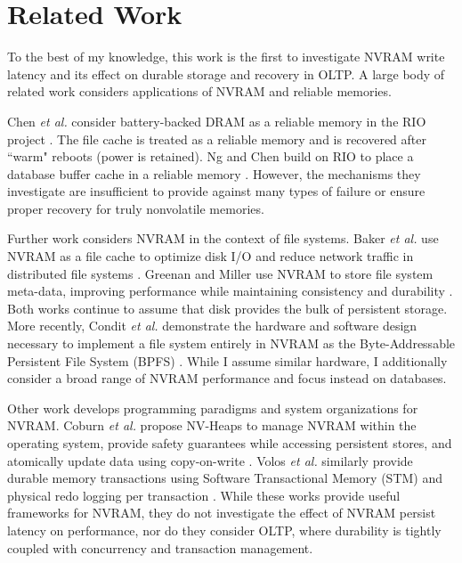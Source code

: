 \section{Related Work}
\label{sec:OLTP_design:RelatedWork}
To the best of my knowledge, this work is the first to investigate NVRAM write latency and its effect on durable storage and recovery in OLTP.
A large body of related work considers applications of NVRAM and reliable memories.

Chen \emph{et al.} consider battery-backed DRAM as a reliable memory in the RIO project \cite{ChenNg96}.
The file cache is treated as a reliable memory and is recovered after ``warm" reboots (power is retained).
Ng and Chen build on RIO to place a database buffer cache in a reliable memory \cite{NgChen97}.
However, the mechanisms they investigate are insufficient to provide against many types of failure or ensure proper recovery for truly nonvolatile memories. 

Further work considers NVRAM in the context of file systems.
Baker \emph{et al.} use NVRAM as a file cache to optimize disk I/O and reduce network traffic in distributed file systems \cite{BakerAsami92}.
Greenan and Miller use NVRAM to store file system meta-data, improving performance while maintaining consistency and durability \cite{GreenanMiller06}.
Both works continue to assume that disk provides the bulk of persistent storage.
More recently, Condit \emph{et al.} demonstrate the hardware and software design necessary to implement a file system entirely in NVRAM as the Byte-Addressable Persistent File System (BPFS) \cite{ConditNightingale09}.
While I assume similar hardware, I additionally consider a broad range of NVRAM performance and focus instead on databases.

Other work develops programming paradigms and system organizations for NVRAM.
Coburn \emph{et al.} propose NV-Heaps to manage NVRAM within the operating system, provide safety guarantees while accessing persistent stores, and atomically update data using copy-on-write \cite{CoburnCaulfield11}.
Volos \emph{et al.} similarly provide durable memory transactions using Software Transactional Memory (STM) and physical redo logging per transaction \cite{VolosTack11}.
While these works provide useful frameworks for NVRAM, they do not investigate the effect of NVRAM persist latency on performance, nor do they consider OLTP, where durability is tightly coupled with concurrency and transaction management.

